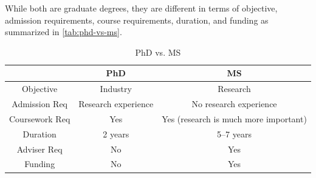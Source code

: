 \documentclass[oneside,11pt,dvipsnames]{book}
\begin{document}
While both are graduate degrees, they are different in terms of objective, admission requirements, course requirements, duration, and funding as summarized in \autoref{tab:phd-vs-ms}.

\begin{table}
  \caption{PhD vs. MS}\label{tab:phd-vs-ms}
  \begin{tabular}{c|c|c}
  \toprule
  \textbf{} & \textbf{PhD} & \textbf{MS} \\
  \midrule
  Objective & Industry & Research \\
  Admission Req & Research experience & No research experience \\
  Coursework Req & Yes & Yes (research is much more important)  \\
  Duration & 2 years & 5--7 years \\
  Adviser Req & No & Yes \\
  Funding & No & Yes \\
  \bottomrule
  \end{tabular}
\end{table}
  
\end{document}
